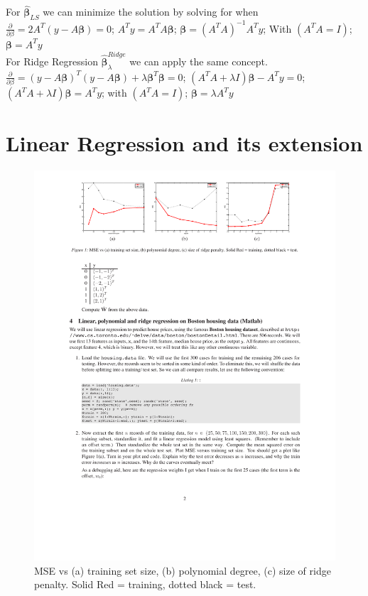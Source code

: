 \documentclass[11pt]{article}
\begin{document}
For $\hat{\bm{\beta}}_{LS}$ we can minimize the solution by solving for when $\frac{\partial }{\partial \beta} = 2A^T(y-A\bm{\beta}) = 0$; 
$A^Ty = A^TA\bm{\beta}$; 
$\bm{\beta} = (A^TA)^{-1}A^Ty$; 
With $(A^TA = I)$; $\bm{\beta} = A^Ty$\\
For Ridge Regression $\hat{\bm{\beta}}_\lambda^{Ridge}$ we can apply the same concept. $\frac{\partial }{\partial \beta} = (y - A\bm{\beta})^T(y - A\bm{\beta}) + \lambda\bm{\beta}^T\bm{\beta} = 0$; $(A^TA + \lambda I)\bm{\beta} - A^Ty = 0$; $(A^TA + \lambda I)\bm{\beta} = A^Ty$; with $(A^TA = I)$; $\bm{\beta} = \lambda A^Ty$


\vspace{4cm}

\section*{Linear Regression and its extension}
\begin{figure}[h]
	\centering
	\includegraphics[width=1\linewidth]{fig}
	\caption{MSE vs (a) training set size, (b) polynomial degree, (c) size of ridge penalty. Solid Red = training, dotted black = test.}
	\label{fig:fig}
\end{figure}
\end{document}
